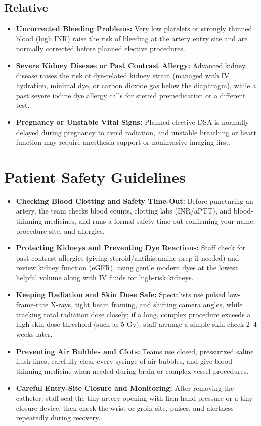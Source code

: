 \subsection{Relative}
\begin{itemize}
\item \textbf{Uncorrected Bleeding Problems:} Very low platelets or strongly thinned blood (high INR) raise the risk of bleeding at the artery entry site and are normally corrected before planned elective procedures.
\item \textbf{Severe Kidney Disease or Past Contrast Allergy:} Advanced kidney disease raises the risk of dye-related kidney strain (managed with IV hydration, minimal dye, or carbon dioxide gas below the diaphragm), while a past severe iodine dye allergy calls for steroid premedication or a different test.
\item \textbf{Pregnancy or Unstable Vital Signs:} Planned elective DSA is normally delayed during pregnancy to avoid radiation, and unstable breathing or heart function may require anesthesia support or noninvasive imaging first.
\end{itemize}

\section{Patient Safety Guidelines}
\begin{itemize}
\item \textbf{Checking Blood Clotting and Safety Time-Out:} Before puncturing an artery, the team checks blood counts, clotting labs (INR/aPTT), and blood-thinning medicines, and runs a formal safety time-out confirming your name, procedure site, and allergies.
\item \textbf{Protecting Kidneys and Preventing Dye Reactions:} Staff check for past contrast allergies (giving steroid/antihistamine prep if needed) and review kidney function (eGFR), using gentle modern dyes at the lowest helpful volume along with IV fluids for high-risk kidneys.
\item \textbf{Keeping Radiation and Skin Dose Safe:} Specialists use pulsed low-frame-rate X-rays, tight beam framing, and shifting camera angles, while tracking total radiation dose closely; if a long, complex procedure exceeds a high skin-dose threshold (such as 5 Gy), staff arrange a simple skin check 2--4 weeks later.
\item \textbf{Preventing Air Bubbles and Clots:} Teams use closed, pressurized saline flush lines, carefully clear every syringe of air bubbles, and give blood-thinning medicine when needed during brain or complex vessel procedures.
\item \textbf{Careful Entry-Site Closure and Monitoring:} After removing the catheter, staff seal the tiny artery opening with firm hand pressure or a tiny closure device, then check the wrist or groin site, pulses, and alertness repeatedly during recovery.
\end{itemize}

